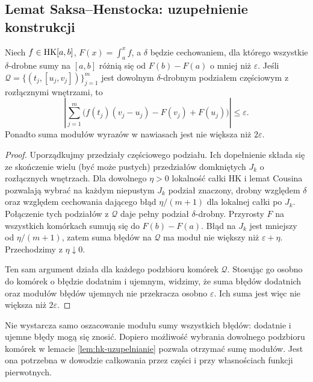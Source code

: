 \subsection*{Lemat Saksa--Henstocka: uzupełnienie konstrukcji}
\begin{lemat}\label{lem:hk-uzupelnianie}
Niech $f\in\mathrm{HK}[a,b]$, $F(x)=\int_a^x f$, a $\delta$ będzie cechowaniem, dla którego wszystkie $\delta$-drobne sumy na $[a,b]$ różnią się od $F(b)-F(a)$ o mniej niż $\varepsilon$. Jeśli $\mathcal Q=\{(t_j,[u_j,v_j])\}_{j=1}^m$ jest dowolnym $\delta$-drobnym podziałem częściowym z rozłącznymi wnętrzami, to
\[
\left|\sum_{j=1}^m\bigl(f(t_j)(v_j-u_j)-F(v_j)+F(u_j)\bigr)\right|\le\varepsilon.
\]
Ponadto suma modułów wyrazów w nawiasach jest nie większa niż $2\varepsilon$.
\end{lemat}
\begin{proof}
Uporządkujmy przedziały częściowego podziału. Ich dopełnienie składa się ze skończenie wielu (być może pustych) przedziałów domkniętych $J_k$ o rozłącznych wnętrzach. Dla dowolnego $\eta>0$ lokalność całki HK i lemat Cousina pozwalają wybrać na każdym niepustym $J_k$ podział znaczony, drobny względem $\delta$ oraz względem cechowania dającego błąd $\eta/(m+1)$ dla lokalnej całki po $J_k$. Połączenie tych podziałów z $\mathcal Q$ daje pełny podział $\delta$-drobny. Przyrosty $F$ na wszystkich komórkach sumują się do $F(b)-F(a)$. Błąd na $J_k$ jest mniejszy od $\eta/(m+1)$, zatem suma błędów na $\mathcal Q$ ma moduł nie większy niż $\varepsilon+\eta$. Przechodzimy z $\eta\downarrow0$.

Ten sam argument działa dla każdego podzbioru komórek $\mathcal Q$. Stosując go osobno do komórek o błędzie dodatnim i ujemnym, widzimy, że suma błędów dodatnich oraz modułów błędów ujemnych nie przekracza osobno $\varepsilon$. Ich suma jest więc nie większa niż $2\varepsilon$.
\end{proof}
\begin{uwaga}
Nie wystarcza samo oszacowanie modułu sumy wszystkich błędów: dodatnie i ujemne błędy mogą się znosić. Dopiero możliwość wybrania dowolnego podzbioru komórek w lemacie \ref{lem:hk-uzupelnianie} pozwala otrzymać sumę modułów. Jest ona potrzebna w dowodzie całkowania przez części i przy własnościach funkcji pierwotnych.
\end{uwaga}

